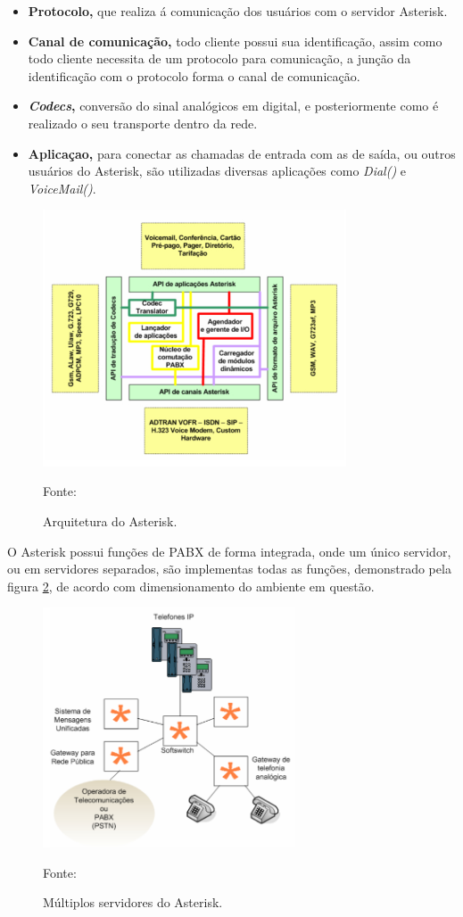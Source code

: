 \begin{itemize}
  \item \textbf{Protocolo,} que realiza á comunicação dos usuários com o servidor Asterisk.
  \item \textbf{Canal de comunicação,} todo cliente possui sua identificação, assim como todo cliente necessita de um protocolo para comunicação, a junção da identificação com o protocolo forma o canal de comunicação.
  \item \textbf{\textit{Codecs},} conversão do sinal analógicos em digital, e posteriormente como é realizado o seu transporte dentro da rede.
  \item \textbf{Aplicaçao,} para conectar as chamadas de entrada com as de saída, ou outros usuários do Asterisk, são utilizadas diversas aplicações como \textit{Dial()} e \textit{VoiceMail()}.
\end{itemize}

\begin{figure}[h]
	\centering
	\includegraphics[width=9cm]{imagens/arquiteturaAsterisk.jpg}
	\caption{Arquitetura do Asterisk.}
    \label{Figura12}
    Fonte: \cite{flavioeduardoandredade2005}
\end{figure}

O Asterisk possui funções de PABX de forma integrada, onde um único servidor, ou em servidores separados, são implementas todas as funções, demonstrado pela figura \ref{Figura13}, de acordo com dimensionamento do ambiente em questão. \cite{djaneelmajoanine2007}

\begin{figure}[h]
	\centering
	\includegraphics[width=7.5cm]{imagens/servidoresAsterisk.jpg}
	\caption{Múltiplos servidores do Asterisk.}
    \label{Figura13}
    Fonte: \cite{flavioeduardoandredade2005}
\end{figure}

